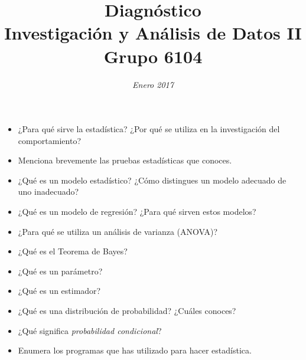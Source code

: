 \documentclass{article}
\begin{document}
\title{\huge Diagnóstico \\
\Large Investigación y Análisis de Datos II \\
Grupo 6104
}
\date{\emph{Enero 2017}}
\maketitle{}
\begin{itemize}
\item{¿Para qué sirve la estadística? ¿Por qué se utiliza en la investigación del comportamiento?}
\item{Menciona brevemente las pruebas estadísticas que conoces.}
\item{¿Qué es un modelo estadístico? ¿Cómo distingues un modelo adecuado de uno inadecuado?}
\item{¿Qué es un modelo de regresión? ¿Para qué sirven estos modelos?}
\item{¿Para qué se utiliza un análisis de varianza (ANOVA)?}
\item{¿Qué es el Teorema de Bayes?}
\item{¿Qué es un parámetro?}
\item{¿Qué es un estimador?}
\item{¿Qué es una distribución de probabilidad? ¿Cuáles conoces?}
\item{¿Qué significa \emph{probabilidad condicional}?}
\item{Enumera los programas que has utilizado para hacer estadística.}
\end{itemize}
\end{document}
